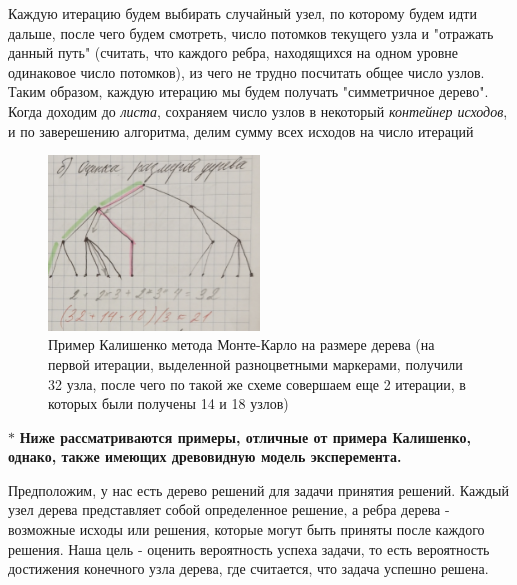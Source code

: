             Каждую итерацию будем выбирать случайный узел, по которому будем идти дальше, после чего будем смотреть, число потомков текущего узла и "отражать данный путь" (считать, что каждого ребра, находящихся на одном уровне одинаковое число потомков), из чего не трудно посчитать общее число узлов. Таким образом, каждую итерацию мы будем получать "симметричное дерево".\\
            
            Когда доходим до \textit{листа}, сохраняем число узлов в некоторый \textit{контейнер исходов}, и по заверешению алгоритма, делим сумму всех исходов на число итераций

            \begin{figure}[H]
                \centering
                \includegraphics[width=0.5\textwidth]{images/chapter1/tree-size-example.png}
                \caption{Пример Калишенко метода Монте-Карло на размере дерева (на первой итерации, выделенной разноцветными маркерами, получили 32 узла, после чего по такой же схеме совершаем еще 2 итерации, в которых были получены 14 и 18 узлов)}
                \label{fig:images/chapter1/tree-size-example.png}
            \end{figure}

            \begin{center}
                $\ast$ \textbf{Ниже рассматриваются примеры, отличные от примера Калишенко, однако, также имеющих древовидную модель эксперемента.}
            \end{center}
        
            Предположим, у нас есть дерево решений для задачи принятия решений. Каждый узел дерева представляет собой определенное решение, а ребра дерева - возможные исходы или решения, которые могут быть приняты после каждого решения. Наша цель - оценить вероятность успеха задачи, то есть вероятность достижения конечного узла дерева, где считается, что задача успешно решена.

